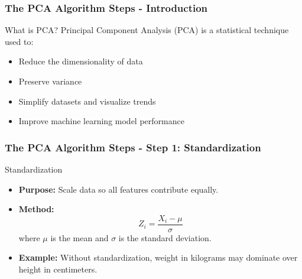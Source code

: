 \documentclass[aspectratio=169]{beamer}
\begin{document}
\begin{frame}[fragile]
    \frametitle{The PCA Algorithm Steps - Introduction}
    \begin{block}{What is PCA?}
        Principal Component Analysis (PCA) is a statistical technique used to:
        \begin{itemize}
            \item Reduce the dimensionality of data
            \item Preserve variance
            \item Simplify datasets and visualize trends
            \item Improve machine learning model performance
        \end{itemize}
    \end{block}
\end{frame}

\begin{frame}[fragile]
    \frametitle{The PCA Algorithm Steps - Step 1: Standardization}
    \begin{block}{Standardization}
        \begin{itemize}
            \item \textbf{Purpose:} Scale data so all features contribute equally.
            \item \textbf{Method:}
            \begin{equation}
                Z_i = \frac{X_i - \mu}{\sigma}
            \end{equation}
            where \( \mu \) is the mean and \( \sigma \) is the standard deviation.
            \item \textbf{Example:} Without standardization, weight in kilograms may dominate over height in centimeters.
        \end{itemize}
    \end{block}
\end{frame}
\end{document}
